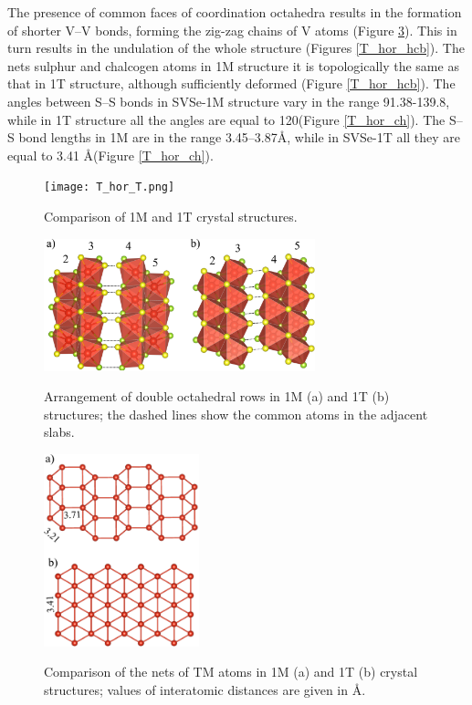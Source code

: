 \documentclass[a4paperm]{article}
\begin{document}
The presence of common faces of coordination octahedra results in the formation of shorter V--V bonds, forming the zig-zag chains of V atoms (Figure \ref{T_hor_V}).
This in turn results in the undulation of the whole structure (Figures \ref{T_hor_hcb}).
The nets sulphur and chalcogen atoms in 1M structure it is topologically the same as that in 1T structure, although sufficiently deformed (Figure \ref{T_hor_hcb}).
The angles between S--S bonds in SVSe-1M structure vary in the range 91.38-139.8\textdegree, while in 1T structure all the angles are equal to 120\textdegree (Figure \ref{T_hor_ch}).
The S--S bond lengths in 1M are in the range 3.45--3.87\AA, while in SVSe-1T all they are equal to 3.41 \AA (Figure \ref{T_hor_ch}).


\begin{figure}[H]
	\texttt{[image: T\_hor\_T.png]} \\
	\caption{Comparison of 1M and 1T crystal structures.}
	\label{T_hor_T}
\end{figure}

\begin{figure}[H]
	\includegraphics[width=0.7\textwidth]{T_hor_slabs.png} \\
	\caption{Arrangement of double octahedral rows in 1M (a) and 1T (b) structures; the dashed lines show the common atoms in the adjacent slabs.}
	\label{T_hor_slabs}
\end{figure}


\begin{figure}[H]
	\includegraphics[width=0.4\textwidth]{T_hor_V.png} \\
	\caption{Comparison of the nets of TM atoms in 1M (a) and 1T (b) crystal structures; values of interatomic distances are given in \AA.}
	\label{T_hor_V}
\end{figure}
\end{document}
